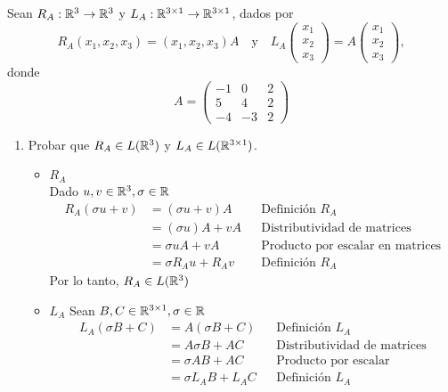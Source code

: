 \item Sean $R_A:\mathbb{R}^3\to\mathbb{R}^3$ y $L_A:\mathbb{R}^{3\times1}\to\mathbb{R}^{3\times1}$, dados por\[R_A(x_1,x_2,x_3)=(x_1,x_2,x_3)A\quad \text{y}\quad L_A\begin{pmatrix}
        x_1\\x_2\\x_3
    \end{pmatrix}=A\begin{pmatrix}
        x_1\\x_2\\x_3
    \end{pmatrix},\]donde\[A=\begin{pmatrix}
        -1&0&2\\5&4&2\\-4&-3&2
    \end{pmatrix}\]\begin{enumerate}
        \item Probar que $R_A\in L(\mathbb{R}^3)$ y $L_A\in L(\mathbb{R}^{3\times1})$.
            \begin{mdframed}[style=s]
                \begin{itemize}
                    \item $R_A$\\
                        Dado $u,v\in\mathbb{R}^3,\sigma\in\mathbb{R}$
                        \begin{align*}
                            R_A(\sigma u+v)&=(\sigma u+v)A&&\text{Definición }R_A\\
                            &=(\sigma u)A+vA&&\text{Distributividad de matrices}\\
                            &=\sigma uA+vA&&\text{Producto por escalar en matrices}\\
                            &=\sigma R_Au+R_Av&&\text{Definición }R_A
                        \end{align*}
                        Por lo tanto, $R_A\in L(\mathbb{R}^3)$
                    \item $L_A$
                        Sean $B,C\in\mathbb{R}^{3\times1},\sigma\in\mathbb{R}$
                        \begin{align*}
                            L_A(\sigma B+C)&=A(\sigma B+C)&&\text{Definición }L_A\\
                            &=A\sigma B+AC&&\text{Distributividad de matrices}\\
                            &=\sigma AB+AC&&\text{Producto por escalar}\\
                            &=\sigma L_AB+L_AC&&\text{Definición }L_A

\end{align*}
\end{itemize}
\end{mdframed}
\end{enumerate}
